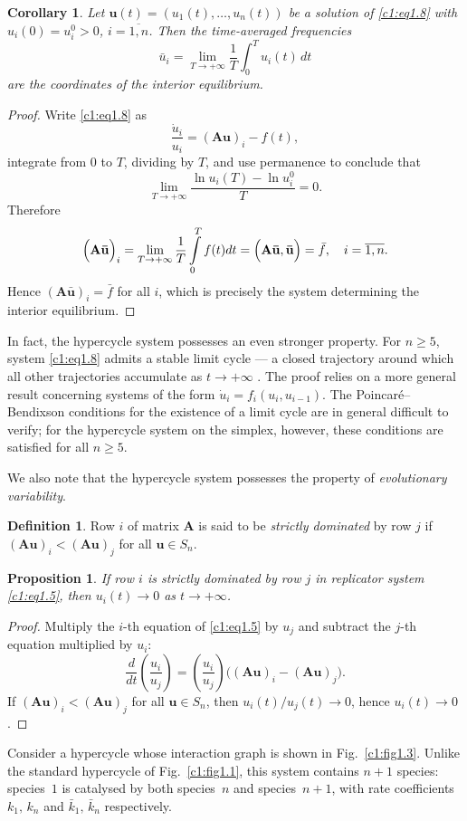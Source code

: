 \documentclass[12pt]{report}
\newtheorem{proposition}[theorem]{Proposition}
\newtheorem{corollary}[theorem]{Corollary}
\theoremstyle{definition}
\newtheorem{definition}[theorem]{Definition}
\theoremstyle{remark}
\begin{document}
\begin{corollary}
Let $\mathbf{u}(t)=(u_{1}(t),\ldots,u_{n}(t))$ be a solution of
\eqref{c1:eq1.8} with $u_{i}(0)=u_{i}^{0}>0$, $i=\overline{1,n}$.
Then the time-averaged frequencies
\[
  \bar{u}_{i}
  =\lim_{T\to+\infty}\frac{1}{T}\int_{0}^{T}u_{i}(t)\,dt
\]
are the coordinates of the interior equilibrium.
\end{corollary}

\begin{proof}
Write \eqref{c1:eq1.8} as
$$
\frac{\dot{u}_{i}}{u_{i}}=(\mathbf{Au})_{i}-f(t),$$
integrate from $0$ to $T$, dividing by $T$, and use permanence
to conclude that
$$\lim_{T\to+\infty}\frac{\ln u_{i}(T)-\ln u_{i}^{0}}{T}=0.$$
Therefore
$$
\Big({\bf A\bar{u}}\Big)_{i} = \lim\limits_{T \to +\infty}\frac{1}{T}\int\limits_{0}^{T}f(t)dt = \Big({\bf A\bar{u}, \bar{u}}\Big) = \bar{f}, \quad i = \overline{1, n}.
$$
Hence $(\mathbf{A\bar{u}})_{i}=\bar{f}$ for all $i$, which is
precisely the system determining the interior equilibrium.
\end{proof}

In fact, the hypercycle system possesses an even stronger property.
For $n\geqslant 5$, system \eqref{c1:eq1.8} admits a stable limit cycle
— a closed trajectory around which all other trajectories accumulate
as $t\to+\infty$ \cite{c1:Hofbauer1998,c1:Hofbauer1991}.  The proof relies on a more
general result \cite{c1:MalletParet1990} 
concerning systems of the form
$\dot{u}_{i}=f_{i}(u_{i},u_{i-1})$.
The Poincar\'e--Bendixson conditions for the existence of a limit
cycle are in general difficult to verify; for the hypercycle system
on the simplex, however, these conditions are satisfied for all
$n \geqslant 5$.

We also note that the hypercycle system possesses the property of
\emph{evolutionary variability}.

\begin{definition}
Row $i$ of matrix $\mathbf{A}$ is said to be \emph{strictly
dominated} by row $j$ if
$(\mathbf{Au})_{i}<(\mathbf{Au})_{j}$ for all $\mathbf{u}\in S_{n}$.
\end{definition}

\begin{proposition}
If row $i$ is strictly dominated by row $j$ in replicator system
\eqref{c1:eq1.5}, then $u_{i}(t)\to 0$ as $t\to+\infty$.
\end{proposition}

\begin{proof}
Multiply the $i$-th equation of \eqref{c1:eq1.5} by $u_{j}$ and
subtract the $j$-th equation multiplied by $u_{i}$:
\[
\frac{d}{dt}\!\left(\frac{u_i}{u_j}\right)
= \left(\frac{u_i}{u_j}\right)\bigl((\mathbf{Au})_i - (\mathbf{Au})_j\bigr).
\]
If $(\mathbf{Au})_{i}<(\mathbf{Au})_{j}$ for all $\mathbf{u}\in S_{n}$,
then $u_{i}(t)/u_{j}(t)\to 0$, hence $u_{i}(t)\to 0$.
\end{proof}
\medskip
Consider a hypercycle whose interaction graph is shown in 
Fig.~\ref{c1:fig1.3}. Unlike the standard hypercycle of 
Fig.~\ref{c1:fig1.1}, this system contains $n+1$ species: species~$1$ 
is catalysed by both species~$n$ and species~$n+1$, with rate 
coefficients $k_1,\,k_n$ and $\bar{k}_1,\,\bar{k}_n$ respectively.
\end{document}
